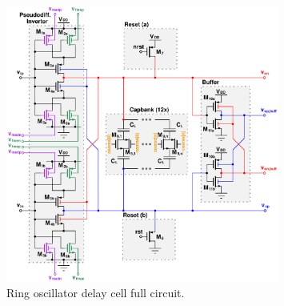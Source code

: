 			\begin{figure}[htb!]
			        \centering
			        \includegraphics[width=0.8\textwidth, angle=0]{./figs/design/delay_cell_full}
			    \caption{Ring oscillator delay cell full circuit.}
			    \label{fig:delay_cell_circuit}
			\end{figure}



